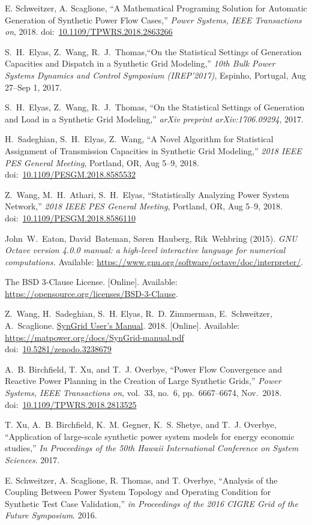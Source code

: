 \documentclass[12pt]{article}
\newcommand{\syngrid}[0]{{SynGrid}}
\newcommand{\syngridver}[0]{1.0}
\newcommand{\syngridmanurl}[0]{https://matpower.org/docs/SynGrid-manual-\syngridver.pdf}
\newcommand{\syngridman}[0]{\href{\syngridmanurl}{\syngrid{} User's Manual}}
\newcommand{\doi}[1]{doi:~\href{https://doi.org/#1}{#1}}
\numberwithin{equation}{section}
\numberwithin{table}{section}
\numberwithin{figure}{section}
\begin{document}
\begin{thebibliography}{99}
E. Schweitzer, A. Scaglione, ``A Mathematical Programing Solution for Automatic Generation of Synthetic Power Flow Cases,''  \emph{Power Systems, IEEE Transactions on}, 2018. \doi{10.1109/TPWRS.2018.2863266}

S.~H.~Elyas, Z.~Wang, R.~J.~Thomas,``On the Statistical Settings of Generation Capacities and Dispatch in a Synthetic Grid Modeling,'' \emph{10th Bulk Power Systems Dynamics and Control Symposium (IREP'2017)}, Espinho, Portugal, Aug 27--Sep 1, 2017.

S.~H.~Elyas, Z.~Wang, R.~J.~Thomas,
  ``On the Statistical Settings of Generation and Load in a Synthetic Grid Modeling,'' \emph{arXiv preprint arXiv:1706.09294}, 2017.

H.~Sadeghian, S.~H.~Elyas, Z.~Wang, ``A Novel Algorithm for Statistical Assignment of Transmission Capacities in Synthetic Grid Modeling,''
\emph{2018 IEEE PES General Meeting}, Portland, OR, Aug 5--9, 2018.
\doi{10.1109/PESGM.2018.8585532}

Z.~Wang, M.~H.~Athari, S.~H.~Elyas, ``Statistically Analyzing Power System Network,'' \emph{2018 IEEE PES General Meeting}, Portland, OR, Aug 5--9, 2018.
\doi{10.1109/PESGM.2018.8586110}

John~W.~Eaton, David~Bateman, S{\o}ren~Hauberg, Rik~Wehbring (2015). \emph{GNU Octave version 4.0.0 manual: a high-level interactive language for numerical computations.} Available: \url{https://www.gnu.org/software/octave/doc/interpreter/}.

The BSD 3-Clause License. [Online]. Available: \url{https://opensource.org/licenses/BSD-3-Clause}.

Z.~Wang, H.~Sadeghian, S.~H. Elyas, R.~D. Zimmerman, E.~Schweitzer,
A.~Scaglione. \syngridman{}. 2018.
[Online]. Available: \url{https://matpower.org/docs/SynGrid-manual.pdf}\\
\doi{10.5281/zenodo.3238679}

A.~B. Birchfield, T. Xu, and T.~J. Overbye, ``Power Flow Convergence and Reactive Power Planning in the Creation of Large Synthetic Grids,''  \emph{Power Systems, IEEE Transactions on}, vol.~33, no.~6, pp.~6667--6674, Nov.~2018.\\ \doi{10.1109/TPWRS.2018.2813525}

T. Xu, A.~B. Birchfield, K.~M. Gegner, K.~S. Shetye, and T.~J. Overbye, ``Application of large-scale synthetic power system models for energy economic studies,''  \emph{In Proceedings of the 50th Hawaii International Conference on System Sciences}. 2017.

E. Schweitzer, A. Scaglione, R. Thomas, and T. Overbye, ``Analysis of the Coupling Between Power System Topology and Operating Condition for Synthetic Test Case Validation,'' \emph{in Proceedings of the 2016 CIGRE Grid of the Future Symposium}. 2016.
\end{thebibliography}
\end{document}
